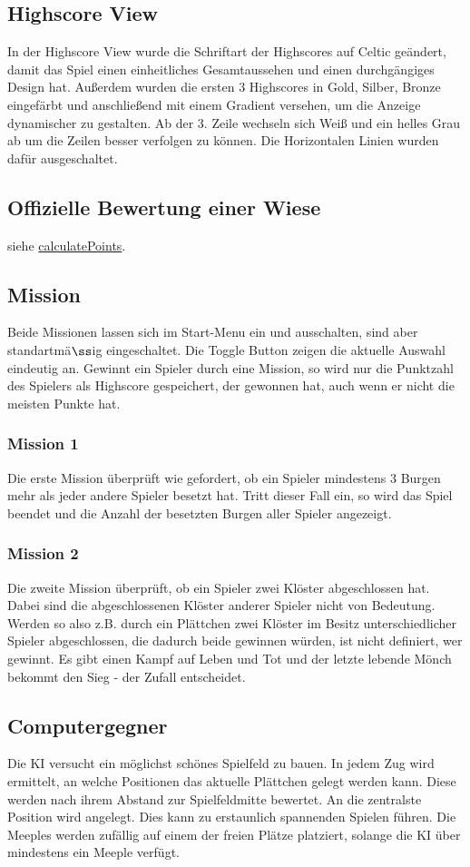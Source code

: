 \documentclass{article}
\begin{document}
\subsection{Highscore View}
In der Highscore View wurde die Schriftart der Highscores auf Celtic geändert, damit das Spiel einen einheitliches Gesamtaussehen und einen durchgängiges Design hat. Außerdem wurden die ersten 3 Highscores in Gold, Silber, Bronze eingefärbt und anschließend mit einem Gradient versehen, um die Anzeige dynamischer zu gestalten. Ab der 3. Zeile wechseln sich Weiß und ein helles Grau ab um die Zeilen besser verfolgen zu können. Die Horizontalen Linien wurden dafür ausgeschaltet.

\subsection{Offizielle Bewertung einer Wiese}
siehe \hyperref[sec:calculatePoints]{calculatePoints}.

\subsection{Mission}
Beide Missionen lassen sich im Start-Menu ein und ausschalten, sind aber standartm\"a$\ss$ig eingeschaltet. Die Toggle Button zeigen die aktuelle Auswahl eindeutig an.
Gewinnt ein Spieler durch eine Mission, so wird nur die Punktzahl des Spielers als Highscore gespeichert, der gewonnen hat, auch wenn er nicht die meisten Punkte hat.

\subsubsection{Mission 1}
Die erste Mission \"uberpr\"uft wie gefordert, ob ein Spieler mindestens 3 Burgen mehr als jeder andere Spieler besetzt hat. Tritt dieser Fall ein, so wird das Spiel beendet und die Anzahl der besetzten Burgen aller Spieler angezeigt.

\subsubsection{Mission 2}
Die zweite Mission \"uberpr\"uft, ob ein Spieler zwei Kl\"oster abgeschlossen hat. Dabei sind die abgeschlossenen Kl\"oster anderer Spieler nicht von Bedeutung. Werden so also z.B. durch ein Pl\"attchen zwei Kl\"oster im Besitz unterschiedlicher Spieler abgeschlossen, die dadurch beide gewinnen w\"urden, ist nicht definiert, wer gewinnt. Es gibt einen Kampf auf Leben und Tot und der letzte lebende M\"onch bekommt den Sieg - der Zufall entscheidet.

\subsection{Computergegner}
Die KI versucht ein m\"oglichst sch\"ones Spielfeld zu bauen. In jedem Zug wird ermittelt, an welche Positionen das aktuelle Pl\"attchen gelegt werden kann. Diese werden nach ihrem Abstand zur Spielfeldmitte bewertet. An die zentralste Position wird angelegt. Dies kann zu erstaunlich spannenden Spielen f\"uhren. Die Meeples werden zuf\"allig auf einem der freien Pl\"atze platziert, solange die KI \"uber mindestens ein Meeple verf\"ugt.
\end{document}
